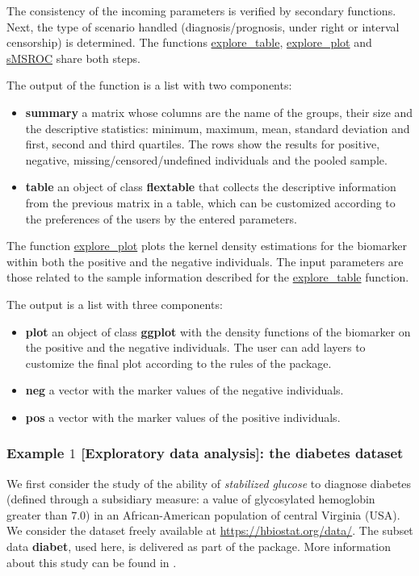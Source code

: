 The consistency of the incoming parameters is verified by secondary functions. Next, the type of scenario handled (diagnosis/prognosis, under right or interval censorship) is determined. The functions \url{explore_table}, \url{explore_plot} and \url{sMSROC} share both steps.

The output of the function is a list with two components:

\begin{itemize}
\item {\textbf{summary}} {a matrix whose columns are the name of the groups, their size and the descriptive statistics: minimum, maximum, mean, standard deviation and first, second and third quartiles. The rows show the results for positive, negative, missing/censored/undefined individuals and the pooled sample.}
\item {\textbf{table}} {an object of class {\textbf{flextable}} that collects the descriptive information from the previous matrix in a table, which can be customized according to the preferences of the users by the entered parameters.}
\end{itemize}

The function \url{explore_plot} plots the kernel density estimations for the biomarker within both the positive and the negative individuals. The input parameters are those related to the sample information described for the \url{explore_table} function. 

The output is a list with three components:
\begin{itemize}
\item {\textbf{plot}} {an object of class {\bf ggplot} with the density functions of the biomarker on the positive and the negative individuals. The user can add layers to customize the final plot according to the rules of the   package.}
\item {\textbf{neg}} {a vector with the marker values of the negative individuals.}
\item {\textbf{pos}} {a vector with the marker values of the positive individuals.}
\end{itemize}

\subsubsection{Example $1$ [Exploratory data analysis]: the diabetes dataset}
We first consider the study of the ability of \textit{stabilized glucose} to diagnose diabetes (defined through a subsidiary measure: a value of glycosylated hemoglobin greater than $7.0$) in an African-American population of central Virginia (USA). We consider the dataset freely available at \url{https://hbiostat.org/data/}. The subset data \textbf{diabet}, used here, is delivered as part of the  package. More information about this study can be found in \citet{Willems1997}.

